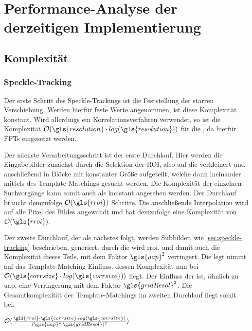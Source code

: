\chapter{Performance-Analyse der derzeitigen Implementierung}

\section{Komplexität}

\subsection{Speckle-Tracking}

Der erste Schritt des Speckle-Trackings ist die Feststellung der starren Verschiebung. Werden hierfür feste Werte angenommen, ist diese Komplexität konstant. Wird allerdings ein Korrelationsverfahren verwendet, so ist die Komplexität $\mathcal{O}(\gls{resolution} \cdot log(\gls{resolution}))$ für die  , da hierfür \glspl{FFT} eingesetzt werden. 

Der nächste Verarbeitungsschritt ist der erste Durchlauf. Hier werden die Eingabebilder zunächst durch die Selektion der \gls{ROI}, also auf die   verkleinert und anschließend in Blöcke mit konstanter Größe aufgeteilt, welche dann ineinander mittels des Template-Matchings gesucht werden. Die Komplexität der einzelnen Suchvorgänge kann somit auch als konstant angesehen werden. Der Durchlauf braucht demzufolge $\mathcal{O}(\gls{rroi})$ Schritte. Die anschließende Interpolation wird auf alle Pixel des Bildes angewandt und hat demzufolge eine Komplexität von $\mathcal{O}(\gls{rroi})$.

Der zweite Durchlauf, der als nächstes folgt, werden Subbilder, wie \ref{sec:speckle-tracking} beschrieben, generiert. durch die   wird \gls{rroi}, und damit auch die Komplexität dieses Teils, mit dem Faktor $\gls{uap}^2$ verringert. Die   legt nimmt auf das Template-Matching Einfluss, dessen Komplexität nun bei $\mathcal{O}(\gls{corrsize} \cdot log(\gls{corrsize}))$ liegt. Der Einfluss der   ist, ähnlich zu \gls{uap}, eine Verringerung mit dem Faktor $\gls{gridResol}^2$. Die Gesamtkomplexität der Template-Matchings im zweiten Durchlauf liegt somit bei:

\begin{center}
	$\mathcal{O}(\frac{\gls{rroi} \cdot \gls{corrsize} \cdot log(\gls{corrsize})}{(\gls{uap}^2 \cdot \gls{gridResol})^2})$
\end{center}

